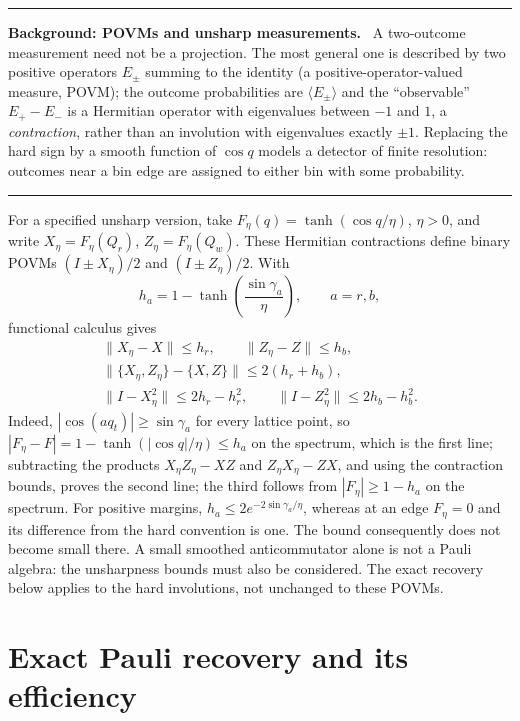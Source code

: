 \documentclass[11pt,a4paper]{article}
\newenvironment{background}[1]{\par\medskip\noindent\hrule\smallskip\noindent\textbf{Background: #1.}\ \ignorespaces}{\par\smallskip\noindent\hrule\medskip}
\begin{document}
\begin{background}{POVMs and unsharp measurements}
A two-outcome measurement need not be a projection. The most general one is described by two positive operators $E_\pm$ summing to the identity (a positive-operator-valued measure, POVM); the outcome probabilities are $\langle E_\pm\rangle$ and the ``observable'' $E_+-E_-$ is a Hermitian operator with eigenvalues between $-1$ and $1$, a \emph{contraction}, rather than an involution with eigenvalues exactly $\pm1$. Replacing the hard sign by a smooth function of $\cos q$ models a detector of finite resolution: outcomes near a bin edge are assigned to either bin with some probability.
\end{background}
For a specified unsharp version, take $F_\eta(q)=\tanh(\cos q/\eta)$, $\eta>0$, and write $X_\eta=F_\eta(Q_r)$, $Z_\eta=F_\eta(Q_w)$. These Hermitian contractions define binary POVMs $(I\pm X_\eta)/2$ and $(I\pm Z_\eta)/2$. With
\begin{equation}
h_a=1-\tanh\!\left(\frac{\sin\gamma_a}{\eta}\right),\qquad a=r,b,
\label{eq:smoothh}
\end{equation}
functional calculus gives
\begin{equation}
\begin{gathered}
\|X_\eta-X\|\le h_r,\qquad \|Z_\eta-Z\|\le h_b,\\
\|\{X_\eta,Z_\eta\}-\{X,Z\}\|\le2(h_r+h_b),\\
\|I-X_\eta^2\|\le2h_r-h_r^2,\qquad
\|I-Z_\eta^2\|\le2h_b-h_b^2.
\end{gathered}
\label{eq:smoothbounds}
\end{equation}
Indeed, $|\cos(aq_t)|\ge\sin\gamma_a$ for every lattice point, so $|F_\eta-F|=1-\tanh(|\cos q|/\eta)\le h_a$ on the spectrum, which is the first line; subtracting the products $X_\eta Z_\eta-XZ$ and $Z_\eta X_\eta-ZX$, and using the contraction bounds, proves the second line; the third follows from $|F_\eta|\ge1-h_a$ on the spectrum. For positive margins, $h_a\le2e^{-2\sin\gamma_a/\eta}$, whereas at an edge $F_\eta=0$ and its difference from the hard convention is one. The bound consequently does not become small there. A small smoothed anticommutator alone is not a Pauli algebra: the unsharpness bounds must also be considered. The exact recovery below applies to the hard involutions, not unchanged to these POVMs.

\section{Exact Pauli recovery and its efficiency}
\label{sec:recovery}
\end{document}
